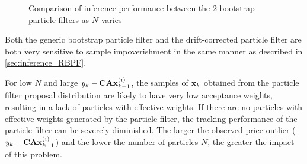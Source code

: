 \documentclass[../main.tex]{subfiles}
\begin{document}
\begin{figure}[h!]
	\centering
	\qquad

	\qquad
	\caption{Comparison of inference performance between the 2 bootstrap particle filters as $N$ varies}
	\label{fig:4__1__1__boostrap_comparison}
\end{figure}

Both the generic bootstrap particle filter and the drift-corrected particle filter are both very sensitive to sample impoverishment in the same manner as described in \autoref{sec:inference_RBPF}. 

For low $N$ and large $y_k - {\bf CA}{\bf x}_{k-1}^{(i)}$, the samples of ${\bf x}_k$ obtained from the particle filter proposal distribution are likely to have very low acceptance weights, resulting in a lack of particles with effective weights. If there are no particles with effective weights generated by the particle filter, the tracking performance of the particle filter can be severely diminished. The larger the observed price outlier ($y_k - {\bf CA}{\bf x}_{k-1}^{(i)}$) and the lower the number of particles $N$, the greater the impact of this problem. 
\end{document}
